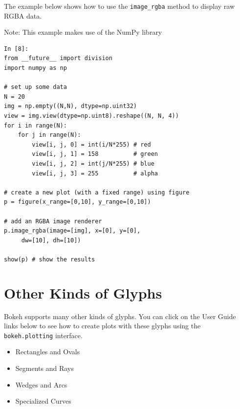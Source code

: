 \documentclass[a4paper,12pt]{article}
\begin{document}
The example below shows how to use the \texttt{image\_rgba} method to display raw RGBA data.

Note: This example makes use of the NumPy library
\begin{framed}
	\begin{verbatim}
In [8]:
from __future__ import division
import numpy as np

# set up some data
N = 20
img = np.empty((N,N), dtype=np.uint32)
view = img.view(dtype=np.uint8).reshape((N, N, 4))
for i in range(N):
    for j in range(N):
        view[i, j, 0] = int(i/N*255) # red
        view[i, j, 1] = 158          # green
        view[i, j, 2] = int(j/N*255) # blue
        view[i, j, 3] = 255          # alpha
        
# create a new plot (with a fixed range) using figure
p = figure(x_range=[0,10], y_range=[0,10])

# add an RGBA image renderer
p.image_rgba(image=[img], x=[0], y=[0], 
     dw=[10], dh=[10])

show(p) # show the results
\end{verbatim}
\end{framed}
\newpage
\section{Other Kinds of Glyphs}
Bokeh supports many other kinds of glyphs. You can click on the User Guide links below to see how to create plots with these glyphs using the \texttt{bokeh.plotting} interface.

\begin{itemize}
\item Rectangles and Ovals
\item Segments and Rays
\item Wedges and Arcs
\item Specialized Curves
\end{itemize}

\end{document}
